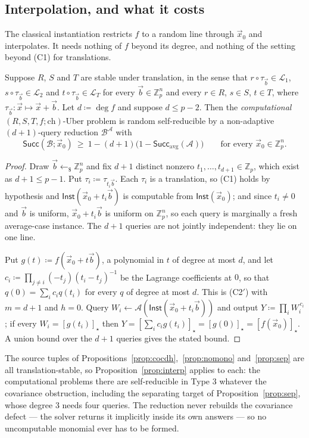\documentclass{conjura-solution}
\newcommand{\Zp}{\mathbb{Z}_p}
\newcommand{\vx}{\vec{x}}
\newcommand{\vb}{\vec{b}}
\newcommand{\Inst}{\mathsf{Inst}}
\newcommand{\Succ}{\mathsf{Succ}}
\newcommand{\LL}{\mathcal{L}}
\newcommand{\rsample}{\leftarrow_{\$}}
\newcommand{\ch}{\mathrm{ch}}
\begin{document}
\subsection{Interpolation, and what it costs}

The classical instantiation restricts $f$ to a random line through $\vx_0$ and interpolates.
It needs nothing of $f$ beyond its degree, and nothing of the setting beyond (C1) for
translations.

\begin{proposition}
\label{prop:interp}
Suppose $R$, $S$ and $T$ are stable under translation, in the sense that $r\circ\tau_{\vb}\in
\LL_1$, $s\circ\tau_{\vb}\in\LL_2$ and $t\circ\tau_{\vb}\in\LL_T$ for every $\vb\in\Zp^{n}$ and
every $r\in R$, $s\in S$, $t\in T$, where $\tau_{\vb}\colon\vx\mapsto\vx+\vb$. Let
$d\coloneqq\deg f$ and suppose $d\le p-2$. Then the \emph{computational}
$(R,S,T,f;\ch)$-Uber problem is random self-reducible by a non-adaptive $(d+1)$-query
reduction $\mathcal B^{\mathcal A}$ with
\[
  \Succ(\mathcal B;\vx_0)\ \ge\ 1-(d+1)\bigl(1-\Succ_{\mathrm{avg}}(\mathcal A)\bigr)
  \qquad\text{for every }\vx_0\in\Zp^{n}.
\]
\end{proposition}
\begin{proof}
Draw $\vb\rsample\Zp^{n}$ and fix $d+1$ distinct nonzero $t_1,\dots,t_{d+1}\in\Zp$, which exist
as $d+1\le p-1$. Put $\tau_i\coloneqq\tau_{t_i\vb}$. Each $\tau_i$ is a translation, so (C1)
holds by hypothesis and $\Inst(\vx_0+t_i\vb)$ is computable from $\Inst(\vx_0)$; and since
$t_i\neq 0$ and $\vb$ is uniform, $\vx_0+t_i\vb$ is uniform on $\Zp^{n}$, so each query is
marginally a fresh average-case instance. The $d+1$ queries are not jointly independent: they
lie on one line.

Put $g(t)\coloneqq f(\vx_0+t\vb)$, a polynomial in $t$ of degree at most $d$, and let
$c_i\coloneqq\prod_{j\neq i}(-t_j)(t_i-t_j)^{-1}$ be the Lagrange coefficients at $0$, so that
$q(0)=\sum_i c_i q(t_i)$ for every $q$ of degree at most $d$. This is (C2$'$) with $m=d+1$ and
$h=0$. Query $W_i\leftarrow\mathcal A(\Inst(\vx_0+t_i\vb))$ and output
$Y\coloneqq\prod_i W_i^{\,c_i}$; if every $W_i=[g(t_i)]_\star$ then
$Y=[\sum_i c_i g(t_i)]_\star=[g(0)]_\star=[f(\vx_0)]_\star$. A union bound over the $d+1$
queries gives the stated bound.
\end{proof}

The source tuples of Propositions~\ref{prop:cocdh},~\ref{prop:nomono} and~\ref{prop:sep} are
all translation-stable, so Proposition~\ref{prop:interp} applies to each: the computational
problems there are self-reducible in Type 3 whatever the covariance obstruction, including
the separating target of Proposition~\ref{prop:sep}, whose degree $3$ needs four queries. The
reduction never rebuilds the covariance defect --- the solver returns it implicitly inside its
own answers --- so no uncomputable monomial ever has to be formed.
\end{document}
